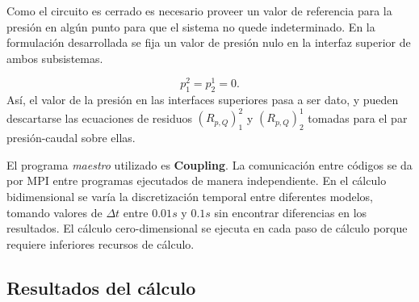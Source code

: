 
Como el circuito es cerrado es necesario proveer un valor de referencia para la presión en algún punto para que el sistema no quede indeterminado.
En la formulación desarrollada se fija un valor de presión nulo en la interfaz superior de ambos subsistemas.

\begin{equation*}
p_1^2 = p_2^1 = 0.
\end{equation*}
Así, el valor de la presión en las interfaces superiores pasa a ser dato,
y pueden descartarse las ecuaciones de residuos $(R_{p,Q})_{1}^{2}$ y $(R_{p,Q})_{2}^{1}$ tomadas para el par presión-caudal sobre ellas.

El programa \textit{maestro} utilizado es \textbf{Coupling}.
La comunicación entre códigos se da por MPI entre programas ejecutados de manera independiente.
En el cálculo bidimensional se varía la discretización temporal entre diferentes modelos, tomando valores de $\Delta t$ entre $0.01s$ y $0.1s$ sin encontrar diferencias en los resultados.
El cálculo cero-dimensional se ejecuta en cada paso de cálculo porque requiere inferiores recursos de cálculo.

\subsection*{Resultados del cálculo}

